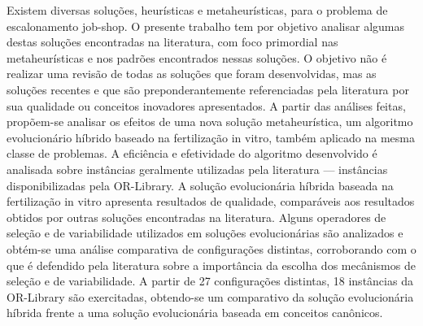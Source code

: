 \documentclass[relatorio,nocolorlinks]{inf-ufg}
\begin{document}
\capa
\publica
\rosto

\begin{aprovacao}
\end{aprovacao}

\begin{resumo}
Existem diversas solu\c{c}\~{o}es, heur\'{i}sticas e metaheur\'{i}sticas, para o problema de escalonamento job-shop. O presente trabalho tem por
objetivo analisar algumas destas solu\c{c}\~{o}es encontradas na literatura, com foco primordial nas metaheur\'{i}sticas e nos padr\~{o}es
encontrados nessas solu\c{c}\~{o}es. O objetivo n\~{a}o \'{e} realizar uma revis\~{a}o de todas as solu\c{c}\~{o}es que foram desenvolvidas, mas as
solu\c{c}\~{o}es recentes e que s\~{a}o preponderantemente referenciadas pela literatura por sua qualidade ou conceitos inovadores apresentados.
A partir das an\'{a}lises feitas, prop\~{o}em-se analisar os efeitos de uma nova solu\c{c}\~{a}o metaheur\'{i}stica, um algoritmo evolucion\'{a}rio
h\'{i}brido baseado na fertiliza\c{c}\~{a}o in vitro, tamb\'{e}m aplicado na mesma classe de problemas. A efici\^{e}ncia e efetividade do
algoritmo desenvolvido \'{e} analisada sobre inst\^{a}ncias geralmente utilizadas pela literatura --- inst\^{a}ncias disponibilizadas pela OR-Library.
A solu\c{c}\~{a}o evolucion\'{a}ria h\'{i}brida baseada na fertiliza\c{c}\~{a}o in vitro apresenta resultados de qualidade, compar\'{a}veis aos
resultados obtidos por outras solu\c{c}\~{o}es encontradas na literatura. Alguns operadores de sele\c{c}\~{a}o e de variabilidade utilizados em
solu\c{c}\~{o}es evolucion\'{a}rias s\~{a}o analizados e obt\'{e}m-se uma an\'{a}lise comparativa de configura\c{c}\~{o}es distintas, corroborando
com o que \'{e} defendido pela literatura sobre a import\^{a}ncia da escolha dos mec\^{a}nismos de sele\c{c}\~{a}o e de variabilidade. A partir de
27 configura\c{c}\~{o}es distintas, 18 inst\^{a}ncias da OR-Library s\~{a}o exercitadas, obtendo-se um comparativo da solu\c{c}\~{a}o
evolucion\'{a}ria h\'{i}brida frente a uma solu\c{c}\~{a}o evolucion\'{a}ria baseada em conceitos can\^{o}nicos.
\end{resumo}
\end{document}
